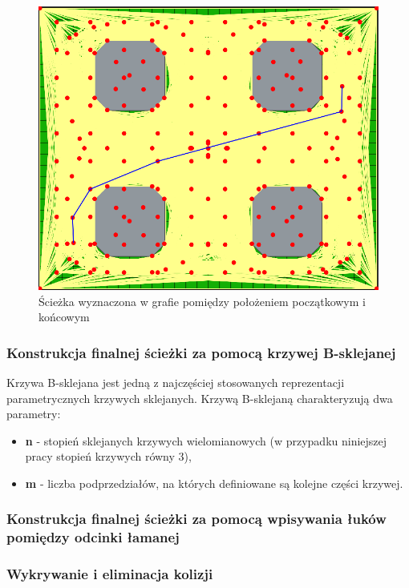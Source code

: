 \documentclass[a4paper,11pt,twoside]{report}
\theoremstyle{definition}
\begin{document}
\begin{figure}[h!]
\centering
\includegraphics[scale=0.4]{polylinePathInVoronoiGraph}
\caption[Ścieżka wyznaczona w grafie pomiędzy położeniem początkowym i końcowym]{Ścieżka wyznaczona w grafie pomiędzy położeniem początkowym i końcowym}
\end{figure}

\subsubsection{Konstrukcja finalnej ścieżki za pomocą krzywej B-sklejanej}

Krzywa B-sklejana jest jedną z najczęściej stosowanych reprezentacji parametrycznych krzywych sklejanych. Krzywą B-sklejaną charakteryzują dwa parametry: 
\begin{itemize}
 \item \textbf{n} - stopień sklejanych krzywych wielomianowych (w przypadku niniejszej pracy stopień krzywych równy 3),
 \item \textbf{m} - liczba podprzedziałów, na których definiowane są kolejne części krzywej.
\end{itemize}

\subsubsection{Konstrukcja finalnej ścieżki za pomocą wpisywania łuków pomiędzy odcinki łamanej}

\subsubsection{Wykrywanie i eliminacja kolizji}
\end{document}
